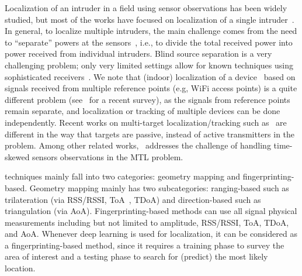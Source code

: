  Localization of an intruder in a field using sensor observations has been widely studied, but most of the works have focused on
localization of a single intruder~\cite{infocom18-spectrum,dutta2016see}.
In general, to localize multiple intruders, the main challenge comes
from the need to ``separate'' powers at the sensors~\cite{mobicom-30},
i.e., to divide the total received power into power received from
individual intruders. Blind source separation is a very challenging
problem; only very limited settings allow for known
techniques using sophisticated receivers~\cite{freq-sig,ben-zhao}.
We note that (indoor) localization of a
  device~\cite{infocom00-radar} based on signals received from multiple reference points (e.g, WiFi access
  points) is a quite different problem
  (see~\cite{zafari-19} for a recent survey), as the signals from
  reference points remain separate, and localization or tracking of multiple
  devices can be done independently.
  Recent works on multi-target localization/tracking such as~\cite{ipsn19-multipassive} are different in the way that targets are passive, instead of active transmitters in the \mtl problem.
Among other related works,~\cite{multi-tx-dyspan-19} addresses the challenge of handling time-skewed sensors observations in the MTL problem.

 techniques mainly fall into two categories: geometry mapping and fingerprinting-based.
Geometry mapping mainly has two subcategories: ranging-based such as trilateration (via RSS/RSSI, ToA~\cite{zongxing2022tracking}, TDoA) and direction-based such as triangulation (via AoA).
Fingerprinting-based methods can use all signal physical measurements including but not limited to amplitude, RSS/RSSI, ToA, TDoA, and AoA.
Whenever deep learning is used for localization, it can be considered as a fingerprinting-based method, since it requires a 
training phase to survey the area of interest and a testing phase to search for (predict) the most likely location.

